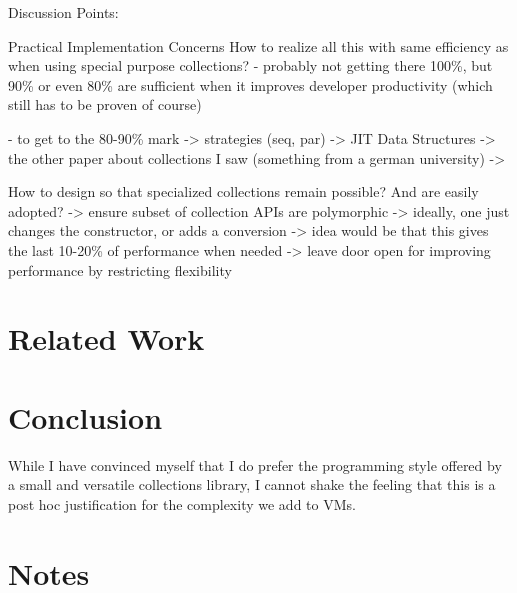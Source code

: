 \documentclass[sigconf, 10pt]{acmart}
\begin{document}
\begin{note}
Discussion Points:
 


Practical Implementation Concerns
 How to realize all this with same efficiency as when using special purpose
 collections?
 - probably not getting there 100\%, but 90\% or even 80\% are sufficient
   when it improves developer productivity (which still has to be proven of course)
  
 - to get to the 80-90\% mark
  -> strategies (seq, par)
  -> JIT Data Structures
     -> the other paper about collections I saw (something from a german university)
  ->

How to design so that specialized collections remain possible?
And are easily adopted?
 -> ensure subset of collection APIs are polymorphic
   -> ideally, one just changes the constructor, or adds a conversion
   -> idea would be that this gives the last 10-20\% of performance when needed
   -> leave door open for improving performance by restricting flexibility
\end{note}




\section{Related Work}

\section{Conclusion}



While I have convinced myself
that I do prefer the programming style offered
by a small and versatile collections library,
I cannot shake the feeling
that this is a post hoc justification
for the complexity we add to VMs.

\section{Notes}
\end{document}
